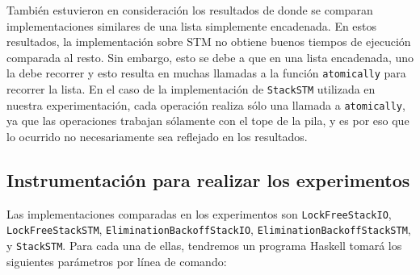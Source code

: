 También estuvieron en consideración los resultados de \cite{linked-list} donde se comparan implementaciones similares de una lista simplemente encadenada.
En estos resultados, la implementación sobre STM no obtiene buenos tiempos de ejecución comparada al resto.
Sin embargo, esto se debe a que en una lista encadenada, uno la debe recorrer y esto resulta en muchas llamadas a la función \texttt{atomically} para recorrer la lista.
En el caso de la implementación de \texttt{StackSTM} utilizada en nuestra experimentación, cada operación realiza sólo una llamada a \texttt{atomically}, ya que las operaciones trabajan sólamente con el tope de la pila, y es por eso que lo ocurrido \cite{linked-list} no necesariamente sea reflejado en los resultados.

\subsection{Instrumentación para realizar los experimentos}\label{subsec:experiment-harness}
Las implementaciones comparadas en los experimentos son \texttt{LockFreeStackIO}, \texttt{LockFreeStackSTM}, \texttt{EliminationBackoffStackIO}, \texttt{EliminationBackoffStackSTM}, y \texttt{StackSTM}. Para cada una de ellas, tendremos un programa Haskell tomará los siguientes parámetros por línea de comando:

